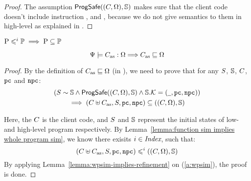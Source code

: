 \begin{proof}
    The assumption $\textsf{ProgSafe}((C, \Omega), \mathbb{S})$
    makes sure that the client code doesn't include instruction
    \csave{}, \crestore{} and \cwr{}, because we do not give
    semantics to them in high-level as explained in
    \Sec{\ref{subsec:High-level Pseudo-SPARCv8 Language}}.
\end{proof}

\begin{lemma}
    \label{lemma:wpsim-implies-refinement}
    \em
    $\text{P} \leqslant^{i} \mathbb{P} \implies \text{P} \subseteq \mathbb{P}$
\end{lemma}

\begin{lemma}
    \em
    \label{lemma:Simulation Implies Primitive Correctness}
    \[
        {\Psi} \models {C_{\text{as}}} : {\Omega}
        \Longrightarrow
        C_{\text{as}} \sqsubseteq \Omega
    \]
\end{lemma}
\begin{proof}
    By the definition of $C_{\text{as}} \sqsubseteq \Omega$
    (in \Def{\ref{def:prim-correctness}}), we need to prove
    that for any $S$, $\mathbb{S}$, $C$, $\texttt{pc}$ and
    $\texttt{npc}$:
    \begin{multline*}
        ({S} \sim {\mathbb{S}} \land
        \textsf{ProgSafe}((C, \Omega), \mathbb{S}) \land
        \mathbb{S}.\mathcal{K} = (\underline{\ \,}, \texttt{pc}, \texttt{npc})) \\
        \implies
        (C\uplus C_{\text{as}}, S, \texttt{pc}, \texttt{npc})
        \subseteq
        ((C, \Omega), \mathbb{S})
    \end{multline*}

    Here, the $C$ is the client code, and
    $S$ and $\mathbb{S}$ represent the initial states
    of low- and high-level program respectively.
    By Lemma~\ref{lemma:function sim implies whole program sim},
    we know there exisits $i \in \textit{Index}$, such that:
    \begin{equation}
        (C\uplus C_{\text{as}}, S, \texttt{pc}, \texttt{npc})
        \leqslant^{i}
        ((C, \Omega), \mathbb{S}) \label{a:wpsim}
    \end{equation}
    By applying Lemma~\ref{lemma:wpsim-implies-refinement}
    on (\ref{a:wpsim}), the proof is done.
\end{proof}

